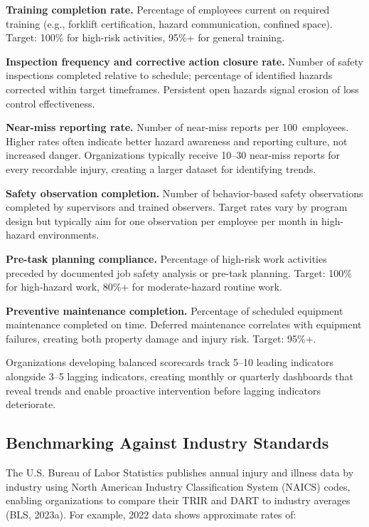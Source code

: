 \documentclass[11pt,openany]{book}
\begin{document}
\textbf{Training completion rate.} Percentage of employees current on required
training (e.g., forklift certification, hazard communication, confined space).
Target: 100\% for high-risk activities, 95\%+ for general training.

\textbf{Inspection frequency and corrective action closure rate.} Number of
safety inspections completed relative to schedule; percentage of identified
hazards corrected within target timeframes. Persistent open hazards signal
erosion of loss control effectiveness.

\textbf{Near-miss reporting rate.} Number of near-miss reports per
100~employees. Higher rates often indicate better hazard awareness and
reporting culture, not increased danger. Organizations typically receive
10--30 near-miss reports for every recordable injury, creating a larger
dataset for identifying trends.

\textbf{Safety observation completion.} Number of behavior-based safety
observations completed by supervisors and trained observers. Target rates vary
by program design but typically aim for one observation per employee per month
in high-hazard environments.

\textbf{Pre-task planning compliance.} Percentage of high-risk work activities
preceded by documented job safety analysis or pre-task planning. Target: 100\%
for high-hazard work, 80\%+ for moderate-hazard routine work.

\textbf{Preventive maintenance completion.} Percentage of scheduled equipment
maintenance completed on time. Deferred maintenance correlates with equipment
failures, creating both property damage and injury risk. Target: 95\%+.

Organizations developing balanced scorecards track 5--10 leading indicators
alongside 3--5 lagging indicators, creating monthly or quarterly dashboards
that reveal trends and enable proactive intervention before lagging indicators
deteriorate.

\subsection{Benchmarking Against Industry Standards}

The U.S. Bureau of Labor Statistics publishes annual injury and illness data
by industry using North American Industry Classification System (NAICS) codes,
enabling organizations to compare their TRIR and DART to industry averages
(BLS, 2023a). For example, 2022 data shows approximate rates of:
\end{document}

